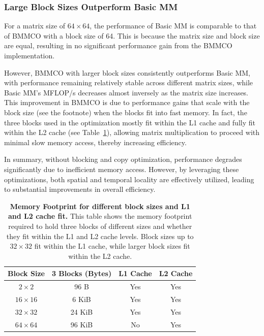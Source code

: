 \subsubsection{Large Block Sizes Outperform Basic MM}
\label{large-block-outperform-basic}

For a matrix size of \(64 \times 64\), the performance of Basic MM is comparable to that of BMMCO with a block size of 64. This is because the matrix size and block size are equal, resulting in no significant performance gain from the BMMCO implementation.

However, BMMCO with larger block sizes consistently outperforms Basic MM, with performance remaining relatively stable across different matrix sizes, while Basic MM’s MFLOP/s decreases almost inversely as the matrix size increases. This improvement in BMMCO is due to performance gains that scale with the block size (see the footnote\footnotemark[3]) when the blocks fit into fast memory. In fact, the three blocks used in the optimization mostly fit within the L1 cache and fully fit within the L2 cache (see Table~\ref{tab:memory-footprint-three-blocks-l1-l2-cache}), allowing matrix multiplication to proceed with minimal slow memory access, thereby increasing efficiency.

In summary, without blocking and copy optimization, performance degrades significantly due to inefficient memory access. However, by leveraging these optimizations, both spatial and temporal locality are effectively utilized, leading to substantial improvements in overall efficiency.

\begin{table}[htbp]
    \centering
    \begin{tabular}{c|c|c|c}
    \textbf{Block Size} & \textbf{3 Blocks (Bytes)} & \textbf{L1 Cache} & \textbf{L2 Cache} \\
    \hline
    \(2 \times 2\) & 96 B & Yes & Yes \\
    \(16 \times 16\) & 6 KiB & Yes & Yes \\
    \(32 \times 32\) & 24 KiB & Yes & Yes \\
    \(64 \times 64\) & 96 KiB & No & Yes \\
    \end{tabular}
    \caption{\textbf{Memory Footprint for different block sizes  and L1 and L2 cache fit.} This table shows the memory footprint required to hold three blocks of different sizes and whether they fit within the L1 and L2 cache levels. Block sizes up to \(32 \times 32\) fit within the L1 cache, while larger block sizes fit within the L2 cache.}
    \label{tab:memory-footprint-three-blocks-l1-l2-cache}
\end{table}

